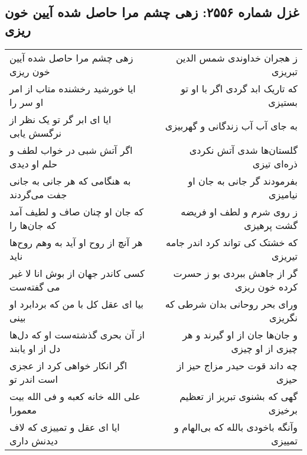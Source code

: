 \begin{center}
\section*{غزل شماره ۲۵۵۶: زهی چشم مرا حاصل شده آیین خون ریزی}
\label{sec:2556}
\begin{longtable}{l p{0.5cm} r}
زهی چشم مرا حاصل شده آیین خون ریزی
&&
ز هجران خداوندی شمس الدین تبریزی
\\
ایا خورشید رخشنده متاب از امر او سر را
&&
که تاریک ابد گردی اگر با او تو بستیزی
\\
ایا ای ابر گر تو یک نظر از نرگسش یابی
&&
به جای آب آب زندگانی و گهربیزی
\\
اگر آتش شبی در خواب لطف و حلم او دیدی
&&
گلستان‌ها شدی آتش نکردی ذره‌ای تیزی
\\
به هنگامی که هر جانی به جانی جفت می‌گردند
&&
بفرمودند گر جانی به جان او نیامیزی
\\
که جان او چنان صاف و لطیف آمد که جان‌ها را
&&
ز روی شرم و لطف او فریضه گشت پرهیزی
\\
هر آنچ از روح او آید به وهم روح‌ها ناید
&&
که خشتک کی تواند کرد اندر جامه تیریزی
\\
کسی کاندر جهان از بوش انا لا غیر می گفته‌ست
&&
گر از جاهش ببردی بو ز حسرت کرده خون ریزی
\\
بیا ای عقل کل با من که بردابرد او بینی
&&
ورای بحر روحانی بدان شرطی که نگریزی
\\
از آن بحری گذشته‌ست او که دل‌ها دل از او یابند
&&
و جان‌ها جان از او گیرند و هر چیزی از او چیزی
\\
اگر انکار خواهی کرد از عجزی است اندر تو
&&
چه داند قوت حیدر مزاج حیز از حیزی
\\
علی الله خانه کعبه و فی الله بیت معمورا
&&
گهی که بشنوی تبریز از تعظیم برخیزی
\\
ایا ای عقل و تمییزی که لاف دیدنش داری
&&
وآنگه باخودی بالله که بی‌الهام و تمییزی
\\
\end{longtable}
\end{center}
